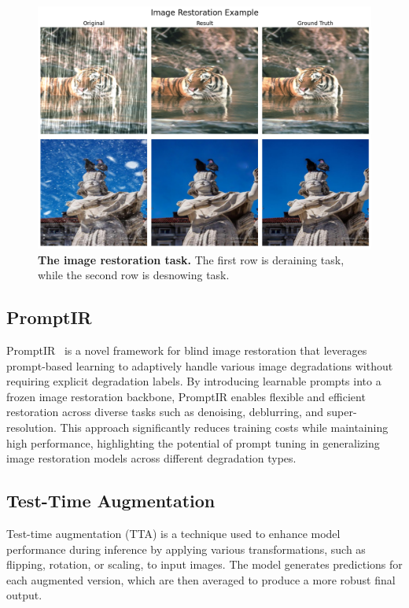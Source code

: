 \documentclass[10pt,twocolumn,letterpaper]{article}
\begin{document}
\begin{figure}[h]
  \centering
  \includegraphics[width=0.95\linewidth]{assets/image_restoration.png}
  \caption{\textbf{The image restoration task.} The first row is deraining task,
    while the second row is desnowing task.}
  \label{fig:image_restoration}
\end{figure}

\subsection{PromptIR}

PromptIR~\cite{PromptIR} is a novel framework for blind image restoration that
leverages prompt-based learning to adaptively handle various image degradations
without requiring explicit degradation labels. By introducing learnable prompts
into a frozen image restoration backbone, PromptIR enables flexible and
efficient restoration across diverse tasks such as denoising, deblurring, and
super-resolution. This approach significantly reduces training costs while
maintaining high performance, highlighting the potential of prompt tuning in
generalizing image restoration models across different degradation types.

\subsection{Test-Time Augmentation}

Test-time augmentation (TTA) is a technique used to enhance model performance
during inference by applying various transformations, such as flipping, rotation,
or scaling, to input images. The model generates predictions for each augmented
version, which are then averaged to produce a more robust final output.
\end{document}
